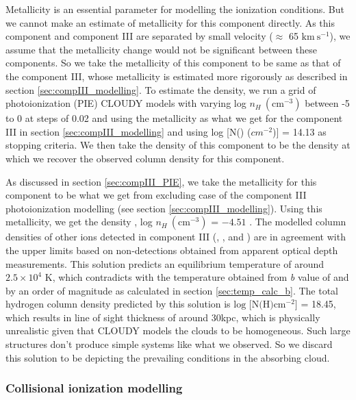 Metallicity is an essential parameter for modelling the ionization conditions. But we cannot make an estimate of metallicity for this component directly. As this component and component III are separated by small velocity ($\approx$ 65 $\text{km} \ \text{s}^{-1}$), we assume that the metallicity change would not be significant between these components. So we take the metallicity of this component to be same as that of the component III, whose metallicity is estimated more rigorously as described in section \ref{sec:compIII_modelling}. To estimate the density, we run a grid of photoionization (PIE) CLOUDY models with varying log $n_H \ (\text{cm}^{-3})$ between -5 to 0 at steps of 0.02 and using the metallicity as what we get for the component III in section \ref{sec:compIII_modelling} and using log [N() (${cm}^{-2}$)] = 14.13 as stopping criteria. We then take the density of this component to be the density at which we recover the  observed column density for this component.

As discussed in section \ref{sec:compIII_PIE}, we take the metallicity for this component to be what we get from excluding  case of the component III photoionization modelling (see section \ref{sec:compIII_modelling}). Using this metallicity, we get the  density , log $n_H \ (\text{cm}^{-3})$ = $-4.51$ . The modelled column densities of other ions detected in component III (, ,  and ) are in agreement with the upper limits based on non-detections obtained from apparent optical depth measurements. This solution predicts an equilibrium temperature of around $2.5\times 10^4$ K, which contradicts with the temperature obtained from \emph{b} value of  and  by an order of magnitude as calculated in section \ref{sec:temp_calc_b}. The total hydrogen column density predicted by this solution is $\text{log [N(H)} \text{cm}^{-2}]$ = 18.45, which results in line of sight thickness of around 30kpc, which is physically unrealistic given that CLOUDY models the clouds to be homogeneous. Such large structures don't produce simple systems like what we observed. So we discard this solution to be depicting the prevailing conditions in the absorbing cloud. 

\subsubsection{Collisional ionization modelling}

